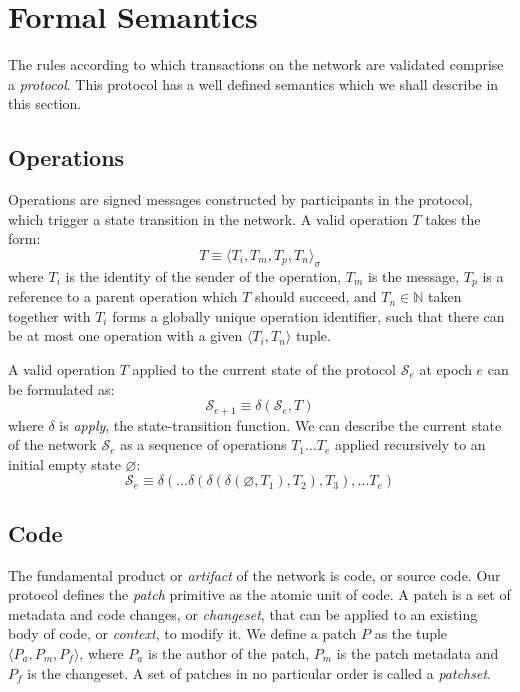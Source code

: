 \section{Formal Semantics}

The rules according to which transactions on the \oscoin{} network are
validated comprise a \emph{protocol}. This protocol has a well defined semantics
which we shall describe in this section.

\subsection{Operations}

Operations are signed messages constructed by participants in the protocol,
which trigger a state transition in the network. A valid operation $T$ takes
the form:
\[
    T \equiv \langle T_i, T_m, T_p, T_n \rangle_{\sigma}
\]
where $T_i$ is the identity of the sender of the operation, $T_m$ is the
message, $T_p$ is a reference to a parent operation which $T$ should succeed,
and $T_n \in \mathbb{N}$ taken together with $T_i$ forms a globally unique
operation identifier, such that there can be at most one operation with a
given $\langle T_i, T_n \rangle$ tuple.

A valid operation $T$ applied to the current state of
the protocol $\mathcal{S}_e$ at epoch $e$ can be formulated as:
\[
    \mathcal{S}_{e+1} \equiv \delta(\mathcal{S}_e, T)
\]
where $\delta$ is \emph{apply}, the state-transition function.  We can
describe the current state of the network $\mathcal{S}_e$ as a sequence of
operations ${T_1 \dots T_e}$ applied recursively to an initial empty state
$\varnothing$:
\[
    \mathcal{S}_e \equiv \delta(\dots \delta(\delta(\delta(\varnothing,
    T_1), T_2), T_3), \dots T_e)
\]

\subsection{Code} The fundamental product or \emph{artifact} of the \oscoin{}
network is code, or source code. Our protocol defines the \emph{patch}
primitive as the atomic unit of code. A patch is a set of metadata and code
changes, or \emph{changeset}, that can be applied to an existing body of code,
or \emph{context}, to modify it. We define a patch $P$ as the tuple $\langle
P_a, P_m, P_f \rangle$, where $P_a$ is the author of the patch, $P_m$ is the
patch metadata and $P_f$ is the changeset. A set of patches in no particular
order is called a \emph{patchset}.

